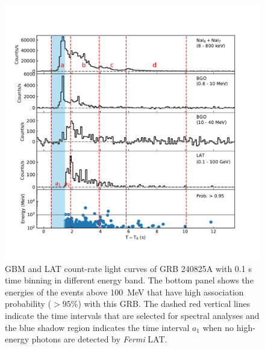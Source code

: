 \documentclass[twocolumn]{aastex631}
\begin{document}
\begin{figure}
\includegraphics[angle=0,scale=0.8]{LC0.pdf}
\caption{GBM and LAT count-rate light curves  of GRB 240825A with 0.1 s time binning in different energy band. The bottom panel shows the energies of the events above 100~MeV that have high association probability ($>95\%$) with this GRB. The dashed red vertical lines indicate the time intervals that are selected for spectral analyses and the blue shadow region indicates the time interval $a_1$ when  no  high-energy photons are detected by {\em Fermi} LAT.
}
\label{lc_all}
\end{figure}
\end{document}
